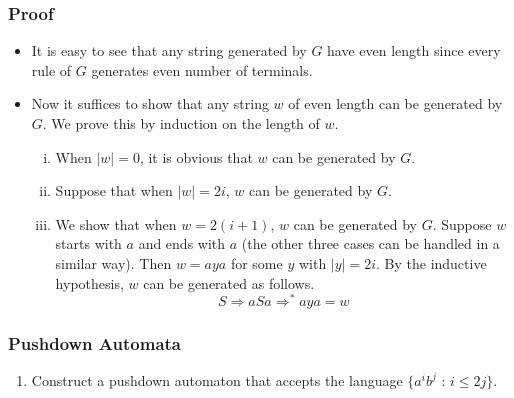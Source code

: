 \documentclass[11.5pt]{beamer}
\begin{document}
\begin{frame}[t]
\frametitle{Proof}
\begin{itemize}
\item It is easy to see that any string generated by $G$ have even length since every rule of $G$ generates even number of terminals.

\item Now it suffices to show that any string $w$ of even length can be generated by $G$. We prove this by induction on the length of $w$. 
\begin{enumerate}[(i)]
\item When $|w| = 0$, it is obvious that $w$ can be generated by $G$. 
\item Suppose that when $|w| = 2i$, $w$ can be generated by $G$. 
\item We show that when $w = 2(i+1)$, $w$ can be generated by $G$. Suppose $w$ starts with $a$ and ends with $a$ (the other three cases can be handled in a similar way). Then $w = aya$ for some $y$ with $|y| = 2i$. By the inductive hypothesis, $w$ can be generated as follows.
    \begin{displaymath}
        S \Rightarrow aSa \Rightarrow^* aya = w
    \end{displaymath}
\end{enumerate}
\end{itemize}
\end{frame}

\begin{frame}[t]
	\frametitle{Pushdown Automata}
	\begin{enumerate}[(1)]
		\item Construct a pushdown automaton that accepts the language $\{\text{$a^ib^j$ : $i \leq 2j$}\}$.
		
		\vspace{2em}
	\end{enumerate}
\end{frame}
\end{document}
